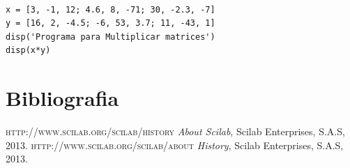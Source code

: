 \documentclass[11pt]{article} %
\begin{document}
\begin{lstlisting}[caption= Código escrito en Scilab para multiplicar dos matrices, label=amb, frame=single]  % Start your code-block

x = [3, -1, 12; 4.6, 8, -71; 30, -2.3, -7]
y = [16, 2, -4.5; -6, 53, 3.7; 11, -43, 1]
disp('Programa para Multiplicar matrices')
disp(x*y)

\end{lstlisting}

\section{Bibliografia}

\begin{thebibliography}{X}
 \textsc{http://www.scilab.org/scilab/history} \textit{About Scilab}, Scilab Enterprises,
S.A.S, 2013.
 \textsc{http://www.scilab.org/scilab/about }  \textit{History}, Scilab Enterprises,
S.A.S, 2013.
\end{thebibliography}
\end{document}
